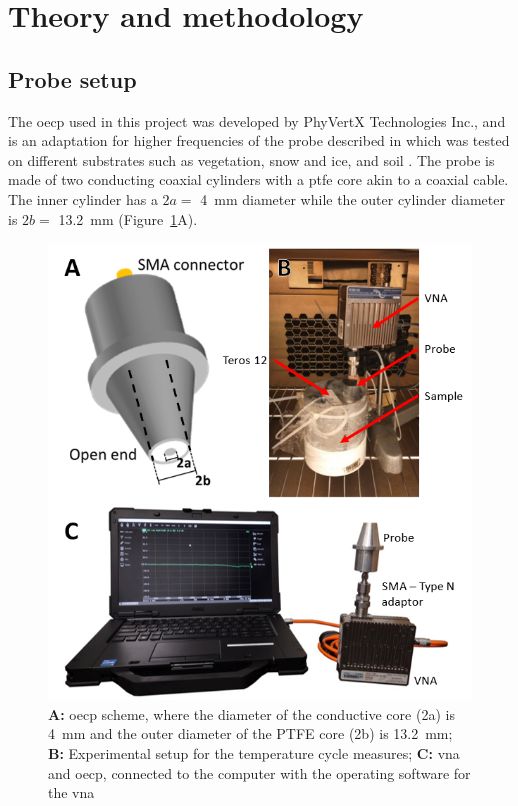 \section{Theory and methodology}\label{sec:metho}

\subsection{Probe setup}\label{subsec:metho-mats}
The \ac{oecp} used in this project was developed by PhyVertX Technologies Inc., and is an adaptation for higher frequencies of the probe described in \parencite{Filali2008} which was tested on different substrates such as vegetation, snow and ice, and soil \parencite{Mavrovic2018,Mavrovic2020,Mavrovic2021}.
The probe is made of two conducting coaxial cylinders with a \ac{ptfe} core akin to a coaxial cable.
The inner cylinder has a \(2a =\) \SI{4}{\mm} diameter while the outer cylinder diameter is \(2b =\) \SI{13.2}{\mm} (Figure~\ref{fig:probe-scheme}A).

\begin{figure}[ht!]
    \centering
    \includegraphics[width=0.9\columnwidth]{Images/method-pic.png}
    \caption[]{\textbf{A:} \ac{oecp} scheme, where the diameter of the conductive core (2a) is \qty{4}{\milli\meter} and the outer diameter of the PTFE core (2b) is \qty{13.2}{\milli\meter}; \textbf{B:} Experimental setup for the temperature cycle measures; \textbf{C:} \ac{vna} and \ac{oecp}, connected to the computer with the operating software for the \ac{vna}}\label{fig:probe-scheme}
\end{figure}

